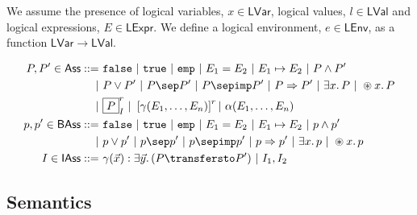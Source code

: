 We assume the presence of logical variables, $x \in \mathsf{LVar}$, logical values, $l \in \mathsf{LVal}$ and logical expressions, $E \in \mathsf{LExpr}$. We define a logical environment, $e \in \mathsf{LEnv}$, as a function $\mathsf{LVar} \rightarrow \mathsf{LVal}$.

\begin{align*}
P, P' \in \mathsf{Ass} ::=&
\ \mathtt{false}\
|\ \mathtt{true}\
|\ \mathtt{emp}\
|\ E_1 = E_2\
|\ E_1 \mapsto E_2\
|\ P \land P' \\
|&\ P \lor P'\
|\ P \sep P'\
|\ P \sepimp P'\
|\ P \Rightarrow P'\
|\ \exists x \ldotp P\
|\ \circledast x \ldotp P \\
|&\ \boxed{P}^r_I\
|\ \left[ \gamma(E_1, \ldots, E_n) \right]^r
|\ \alpha(E_1, \ldots, E_n) \\
p, p' \in \mathsf{BAss} ::=&
\ \mathtt{false}\
|\ \mathtt{true}\
|\ \mathtt{emp}\
|\ E_1 = E_2\
|\ E_1 \mapsto E_2\
|\ p \land p' \\
|&\ p \lor p'\
|\ p \sep p'\
|\ p \sepimp p'\
|\ p \Rightarrow p'\
|\ \exists x \ldotp p\
|\ \circledast x \ldotp p \\
I \in \mathsf{IAss} ::=&
\ \gamma(\vec{x}): \exists \vec{y} \ldotp (P \transfersto P')\ |\ I_1, I_2 \\
\end{align*}

\iffalse
\subsection{Semantics}

